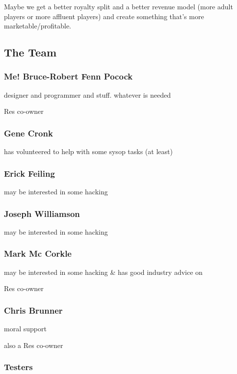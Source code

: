 \documentclass[11pt]{article}
\begin{document}
Maybe we get a better royalty split and a better revenue model (more
adult players or more affluent players) and create something that's
more marketable/profitable.
\subsection{The Team}
\label{sec-1-2}

\subsubsection{Me! Bruce-Robert Fenn Pocock}
\label{sec-1-2-1}

designer and programmer and stuff. whatever is needed 

Res co-owner
\subsubsection{Gene Cronk}
\label{sec-1-2-2}

has volunteered to help with some sysop tasks (at least)
\subsubsection{Erick Feiling}
\label{sec-1-2-3}

may be interested in some hacking
\subsubsection{Joseph Williamson}
\label{sec-1-2-4}

may be interested in some hacking
\subsubsection{Mark Mc Corkle}
\label{sec-1-2-5}

may be interested in some hacking \& has good industry advice on 

Res co-owner
\subsubsection{Chris Brunner}
\label{sec-1-2-6}

moral support

also a Res co-owner

\subsubsection{Testers}
\label{sec-1-2-7}
\end{document}
